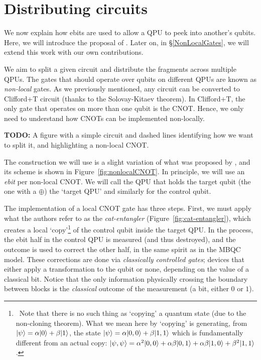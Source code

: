 \section{Distributing circuits}
\label{IntroDistributing}

We now explain how ebits are used to allow a QPU to peek into another's qubits. Here, we will introduce the proposal of \citet{NonLocalCNOT}. Later on, in \S\ref{NonLocalGates}, we will extend this work with our own contributions. 

We aim to split a given circuit and distribute the fragments across multiple QPUs. The gates that should operate over qubits on different QPUs are known as \textit{non-local} gates. As we previously mentioned, any circuit can be converted to Clifford+T circuit (thanks to the Solovay-Kitaev theorem). In Clifford+T, the only gate that operates on more than one qubit is the CNOT. Hence, we only need to understand how CNOTs can be implemented non-locally.

\textbf{TODO:} A figure with a simple circuit and dashed lines identifying how we want to split it, and highlighting a non-local CNOT.

The construction we will use is a slight variation of what was proposed by \citet{NonLocalCNOT}, and its scheme is shown in Figure~\ref{fig:nonlocalCNOT}. In principle, we will use an \textit{ebit} per non-local CNOT. We will call the QPU that holds the target qubit (the one with a \(\oplus\)) the `target QPU' and similarly for the control qubit. 



The implementation of a local CNOT gate has three steps. First, we must apply what the authors refer to as the \textit{cat-entangler} (Figure~\ref{fig:cat-entangler}), which creates a local `copy'\footnote{\, Note that there is no such thing as `copying' a quantum state (due to the non-cloning theorem). What we mean here by `copying' is generating, from \(\vert \psi \rangle = \alpha\vert 0 \rangle + \beta\vert 1 \rangle\), the state \(\vert \psi \rangle = \alpha\vert 0,0 \rangle + \beta\vert 1,1 \rangle\) which is fundamentally different from an actual copy: \(\vert \psi,\psi \rangle = \alpha^2\vert 0,0 \rangle + \alpha\beta\vert 0,1 \rangle + \alpha\beta\vert 1,0 \rangle + \beta^2\vert 1,1 \rangle\).} of the control qubit inside the target QPU. In the process, the ebit half in the control QPU is measured (and thus destroyed), and the outcome is used to correct the other half, in the same spirit as in the MBQC model. These corrections are done via \textit{classically controlled gates}; devices that either apply a transformation to the qubit or none, depending on the value of a classical bit. Notice that the only information physically crossing the boundary between blocks is the \textit{classical} outcome of the measurement (a bit, either \(0\) or \(1\)).

